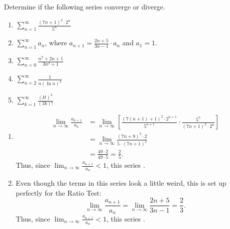 \documentclass[handout]{ximera}
\begin{document}
\begin{problem}
Determine if the following series converge or diverge.
	\begin{enumerate}
	
	\item  $\sum_{n=1}^\infty \frac{(7n+1)^2 \cdot 2^n}{5^n}$
	
	\item  $\sum_{n=1}^\infty a_n$, where $a_{n+1} = \frac{2n+5}{3n-1} \cdot a_n$ and $a_1 = 1$.
	
	\item  $\sum_{n=0}^\infty \frac{n^2 + 2n + 1}{3n^2 +1}$
	
	\item  $\sum_{n=2}^\infty \frac{1}{n(\ln n)^2}$
	
	\item $\sum_{k=1}^{\infty} \frac{(k!)^3}{(3k)!}$
	
	\end{enumerate}
	
	\begin{freeResponse}
		\begin{enumerate}
	
		\item  {}
			\begin{align*}
			\lim_{n \to \infty} \frac{a_{n+1}}{a_n} 
			&= \lim_{n \to \infty} \left[ \frac{(7(n+1) + 1)^2 \cdot 2^{n+1}}{5^{n+1}} \cdot \frac{5^n}{(7n+1)^2 \cdot 2^n} \right]  \\
			&= \lim_{n \to \infty} \frac{(7n+8)^2 \cdot 2}{5 \cdot (7n+1)^2}  \\
			&= \frac{49 \cdot 2}{49 \cdot 5} = \frac{2}{5}.
			\end{align*}
		Thus, since $\lim_{n \to \infty} \frac{a_{n+1}}{a_n} < 1$, this series .  
		
		
	
		\item  {}
		
		Even though the terms in this series look a little weird, this is set up perfectly for the Ratio Test:
			\[
			\lim_{n \to \infty} \frac{a_{n+1}}{a_n} = \lim_{n \to \infty} \frac{2n+5}{3n-1} = \frac{2}{3}.
			\]
		Thus, since $\lim_{n \to \infty} \frac{a_{n+1}}{a_n} < 1$, this series .  
		
		
	

\end{enumerate}
\end{freeResponse}
\end{problem}
\end{document}
